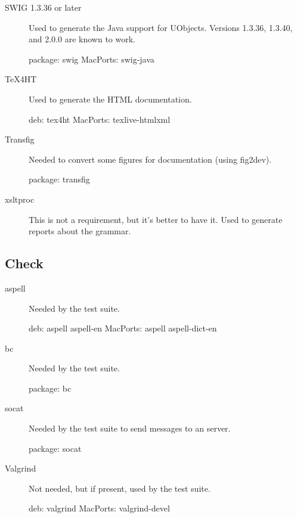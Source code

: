 \begin{description}
\item[SWIG 1.3.36 or later] Used to generate the Java support for UObjects.
  Versions 1.3.36, 1.3.40, and 2.0.0 are known to work.
\begin{package}
package: swig
MacPorts: swig-java
\end{package}

\item[TeX4HT] Used to generate the HTML documentation.
\begin{package}
deb: tex4ht
MacPorts: texlive-htmlxml
\end{package}

\item[Transfig] Needed to convert some figures for documentation
  (using fig2dev).
\begin{package}
package: transfig
\end{package}

\item[xsltproc] This is not a requirement, but it's better to have it. Used
  to generate reports about the \us grammar.
\end{description}

\subsection{Check}

\begin{description}
\item[aspell] Needed by the test suite.
\begin{package}
deb: aspell aspell-en
MacPorts: aspell aspell-dict-en
\end{package}

\item[bc]
  Needed by the test suite.
\begin{package}
package: bc
\end{package}

\item[socat] Needed by the test suite to send messages to an \urbi server.
\begin{package}
package: socat
\end{package}

\item[Valgrind] Not needed, but if present, used by the test suite.
\begin{package}
deb: valgrind
MacPorts: valgrind-devel
\end{package}

\end{description}



